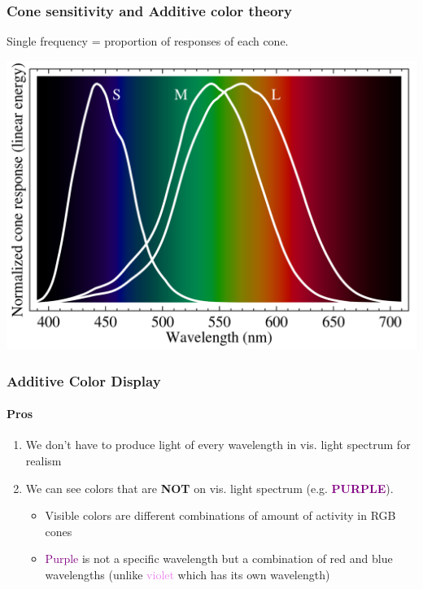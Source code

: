 \documentclass{beamer}
\begin{document}
\begin{frame}
    \frametitle{Cone sensitivity and Additive color theory}

    Single frequency = proportion of responses of each cone.

    \begin{center}
        \includegraphics[scale=0.2]{images/cone-vision.png}
    \end{center}

\end{frame}

\begin{frame}
    \frametitle{Additive Color Display}
    \framesubtitle{Pros}

    \begin{enumerate}
        \item We don't have to produce light of every wavelength in vis. light spectrum for realism
        \item We can see colors that are \textbf{NOT} on vis. light spectrum (e.g. \textcolor{purple}{\textbf{PURPLE}}).
        \begin{itemize}
            \item Visible colors are different combinations of amount of activity in RGB cones
            \item \textcolor{purple}{Purple} is not a specific wavelength but a combination of red and blue wavelengths 
            (unlike \textcolor{violet}{violet} which has its own wavelength)
        \end{itemize}
    \end{enumerate}

\end{frame}
\end{document}
